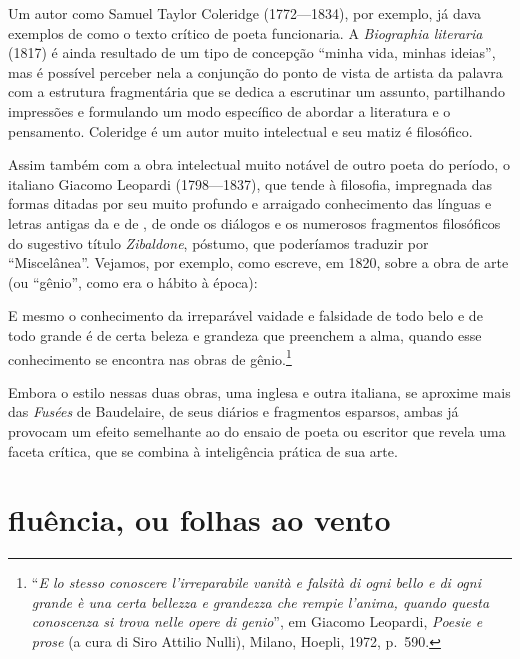 Um autor como Samuel Taylor Coleridge (1772---1834), por exemplo, já
dava exemplos de como o texto crítico de poeta funcionaria. A
\textit{Biographia literaria} (1817) é ainda resultado de um tipo de
concepção “minha vida, minhas ideias”, mas é possível perceber nela a
conjunção do ponto de vista de artista da palavra com a estrutura
fragmentária que se dedica a escrutinar um assunto, partilhando
impressões e formulando um modo específico de abordar a literatura e o
pensamento. Coleridge é um autor muito intelectual e seu matiz é
filosófico.

Assim também com a obra intelectual muito notável de outro poeta
do período, o italiano Giacomo Leopardi (1798---1837), que tende à
filosofia, impregnada das formas ditadas por seu muito profundo e
arraigado conhecimento das línguas e letras antigas da  e de
, de onde os diálogos e os numerosos fragmentos filosóficos do
sugestivo título \textit{Zibaldone}, póstumo, que poderíamos traduzir
por “Miscelânea”. Vejamos, por exemplo, como escreve, em 1820, sobre a
obra de arte (ou “gênio”, como era o hábito à época):

\begin{hedraquote}
E mesmo o conhecimento da irreparável vaidade e falsidade de todo belo e de todo
grande é de certa beleza e grandeza que preenchem a alma, quando
esse conhecimento se encontra nas obras de gênio.\footnote{ ``\textit{E 
lo stesso conoscere l’irreparabile vanità e falsità di ogni bello e di
ogni grande è una certa bellezza e grandezza che rempie l’anima, quando
questa conoscenza si trova nelle opere di genio}'', em Giacomo Leopardi, 
\textit{Poesie e prose} (a cura di Siro Attilio Nulli), Milano, Hoepli, 1972, p.~590.}           
\end{hedraquote}

Embora o estilo nessas duas obras, uma inglesa e outra italiana, se
aproxime mais das \textit{Fusées} de Baudelaire, de seus diários e
fragmentos esparsos, ambas já provocam um efeito semelhante ao do
ensaio de poeta ou escritor que revela uma faceta crítica, que se
combina à inteligência prática de sua arte.

\section{fluência, ou folhas ao vento}

